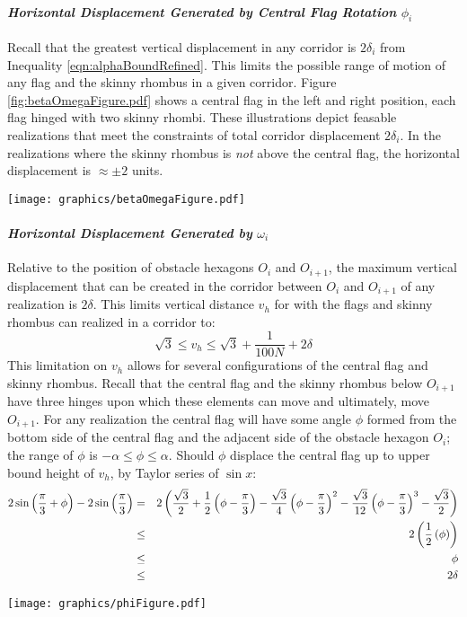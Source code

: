 \paragraph{\textit{Horizontal Displacement Generated by Central Flag Rotation} $\phi_i$}
Recall that the greatest vertical displacement in any corridor is $2\delta_i$ from Inequality \ref{eqn:alphaBoundRefined}.  
This limits the possible range of motion of any flag and the skinny rhombus in a given corridor.  
Figure \ref{fig:betaOmegaFigure.pdf} shows a central flag in the left and right position, each flag hinged with two skinny rhombi.
These illustrations depict feasable realizations that meet the constraints of total corridor displacement $2 \delta_i$.  
In the realizations where the skinny rhombus is \textit{not} above the central flag, the horizontal displacement is $\approx \pm 2$ units. 

\begin{minipage}{\linewidth}
\begin{center}
\texttt{[image: graphics/betaOmegaFigure.pdf]}
\label{fig:betaOmegaFigure.pdf}
\end{center}
\end{minipage}

\paragraph{\textit{Horizontal Displacement Generated by} $\omega_i$}
Relative to the position of obstacle hexagons $O_i$ and $O_{i+1}$, the maximum vertical displacement that can be created in the corridor between $O_i$ and $O_{i+1}$ of any realization is $2 \delta$.  
This limits vertical distance $v_h$ for with the flags and skinny rhombus can realized in a corridor to:
$$\sqrt{3}\leq v_h \leq \sqrt{3} + \frac{1}{100N} + 2 \delta$$
This limitation on $v_h$ allows for several configurations of the central flag and skinny rhombus.  
Recall that the central flag and the skinny rhombus below $O_{i+1}$ have three hinges upon which these elements can move and ultimately, move $O_{i+1}$.  
For any realization the central flag will have some angle $\phi$ formed from the bottom side of the central flag and the adjacent side of the obstacle hexagon $O_i$; the range of $\phi$ is $-\alpha \leq \phi \leq \alpha$.  
Should $\phi$ displace the central flag up to upper bound height of $v_h$, by Taylor series of $\sin x$:
\begin{eqnarray*}
2 \sin \left( \frac{\pi}{3}+\phi \right) - 2 \sin \left( \frac{\pi}{3} \right) &=& 2\left( \frac{\sqrt{3}}{2} + \frac{1}{2} \left( \phi - \frac{\pi}{3}  \right) - \frac{\sqrt{3}}{4}  \left( \phi - \frac{\pi}{3} \right)^2 - \frac{\sqrt{3}}{12}  \left( \phi - \frac{\pi}{3} \right)^3   - \frac{\sqrt{3}}{2} \right) \\
&\leq& 2 \left( \frac{1}{2} \left( \phi \right) \right)\\
&\leq& \phi\\
&\leq& 2 \delta  
\end{eqnarray*}




\begin{minipage}{\linewidth}
\begin{center}
\texttt{[image: graphics/phiFigure.pdf]}
\label{fig:phiFigure.pdf}
\end{center}
\end{minipage}


